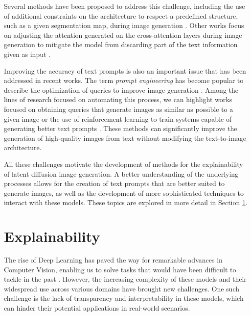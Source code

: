 Several methods have been proposed to address this challenge, including the use of additional constraints on the architecture to respect a predefined structure, such as a given segmentation map, during image generation \cite{zhang2023adding}. Other works focus on adjusting the attention generated on the cross-attention layers during image generation to mitigate the model from discarding part of the text information given as input \cite{AttendAndExcite}.

Improving the accuracy of text prompts is also an important issue that has been addressed in recent works. The term \emph{prompt engineering} has become popular to describe the optimization of queries to improve image generation \cite{promptEngineering}. Among the lines of research focused on automating this process, we can highlight works focused on obtaining queries that generate images as similar as possible to a given image \cite{HardPromptsMadeEasy} or the use of reinforcement learning to train systems capable of generating better text prompts \cite{Promptist}. These methods can significantly improve the generation of high-quality images from text without modifying the text-to-image architecture.

All these challenges motivate the development of methods for the explainability of latent diffusion image generation. A better understanding of the underlying processes allows for the creation of text prompts that are better suited to generate images, as well as the development of more sophisticated techniques to interact with these models. 
These topics are explored in more detail in Section \ref{sec:explainability}.



\section{Explainability}
\label{sec:explainability}

The rise of Deep Learning has paved the way for remarkable advances in Computer Vision, enabling us to solve tasks that would have been difficult to tackle in the past \cite{Chai2021}. However, the increasing complexity of these models and their widespread use across various domains have brought new challenges. One such challenge is the lack of transparency and interpretability in these models, which can hinder their potential applications in real-world scenarios.

